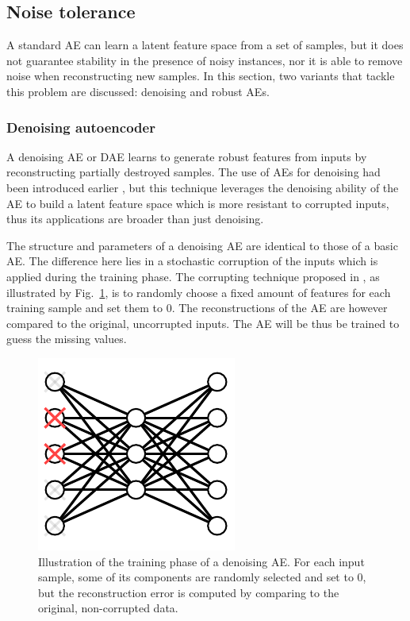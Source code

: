 \subsection{Noise tolerance}\label{p1Sec.NoiseTolerance}

A standard AE can learn a latent feature space from a set of samples, but it does not guarantee stability in the presence of noisy instances, nor it is able to remove noise when reconstructing new samples. In this section, two variants that tackle this problem are discussed: denoising and robust AEs.

\subsubsection{Denoising autoencoder}

A denoising AE or DAE  learns to generate robust features from inputs by reconstructing partially destroyed samples. The use of AEs for denoising had been introduced earlier , but this technique leverages the denoising ability of the AE to build a latent feature space which is more resistant to corrupted inputs, thus its applications are broader than just denoising. 

The structure and parameters of a denoising AE are identical to those of a basic AE. The difference here lies in a stochastic corruption of the inputs which is applied during the training phase. The corrupting technique proposed in , as illustrated by Fig.~\ref{p1Fig.Denoising}, is to randomly choose a fixed amount of features for each training sample and set them to 0. The reconstructions of the AE are however compared to the original, uncorrupted inputs. The AE will be thus be trained to guess the missing values.

\begin{figure}[ht!]
	\centering
	\includegraphics[width=0.7\linewidth]{Denoising.pdf} 

	\caption{Illustration of the training phase of a denoising AE. For each input sample, some of its components are randomly selected and set to 0, but the reconstruction error is computed by comparing to the original, non-corrupted data.}
	\label{p1Fig.Denoising}
\end{figure}

